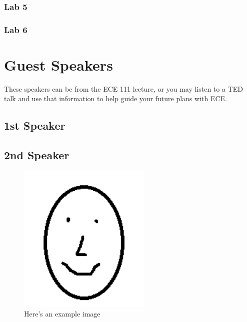 \documentclass[journal]{IEEEtran}
\begin{document}
\subsubsection{Lab 5}
\subsubsection{Lab 6}

\section{Guest Speakers}
These speakers can be from the ECE 111 lecture, or you may listen to a TED talk and use that information to help guide your future plans with ECE.
\subsection{1st Speaker}
\subsection{2nd Speaker}


%
%
\begin{figure}[!t]
\centering
\includegraphics[width=2.5in]{face.png}
\caption{Here's an example image}
\label{fig:example}
\end{figure}
\end{document}

